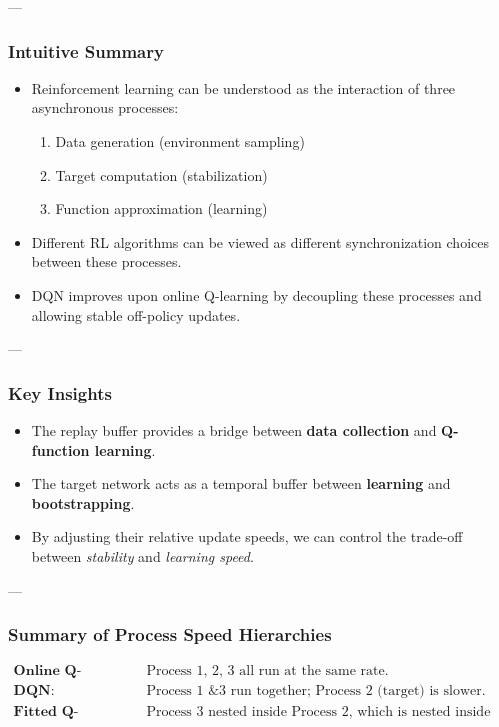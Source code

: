 \documentclass[12pt]{article}
\theoremstyle{definition} %
\theoremstyle{plain} %
\theoremstyle{remark} %
\begin{document}
\begin{CJK}{UTF8}{gbsn}
---

\subsubsection{Intuitive Summary}

\begin{itemize}
    \item Reinforcement learning can be understood as the interaction of three asynchronous processes:
        \begin{enumerate}
            \item Data generation (environment sampling)
            \item Target computation (stabilization)
            \item Function approximation (learning)
        \end{enumerate}
    \item Different RL algorithms can be viewed as different synchronization choices between these processes.
    \item DQN improves upon online Q-learning by decoupling these processes and allowing stable off-policy updates.
\end{itemize}

---

\subsubsection{Key Insights}

\begin{itemize}
    \item The replay buffer provides a bridge between \textbf{data collection} and \textbf{Q-function learning}.
    \item The target network acts as a temporal buffer between \textbf{learning} and \textbf{bootstrapping}.
    \item By adjusting their relative update speeds, we can control the trade-off between \textit{stability} and \textit{learning speed}.
\end{itemize}

---

\subsubsection{Summary of Process Speed Hierarchies}

\[
\begin{array}{ll}
\textbf{Online Q-learning:} & \text{Process 1, 2, 3 all run at the same rate.} \\
\textbf{DQN:} & \text{Process 1 \& 3 run together; Process 2 (target) is slower.} \\
\textbf{Fitted Q-Iteration:} & \text{Process 3 nested inside Process 2, which is nested inside Process 1.}
\end{array}
\]


\end{CJK}
\end{document}
